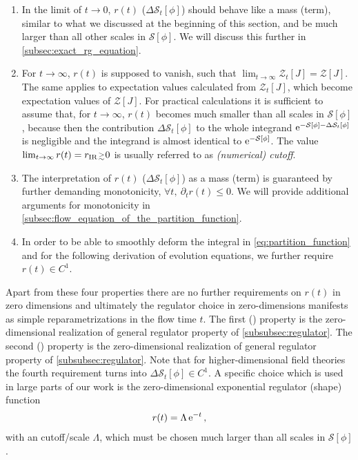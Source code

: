 	\begin{enumerate}
		\item	In the limit of $t \rightarrow 0$, $r(t)$ ($\Delta \mathcal{S}_t [ \phi ] $) should behave like a mass (term), similar to what we discussed at the beginning of this section, and be much larger than all other scales in $\mathcal{S}[\phi]$. We will discuss this further in \cref{subsec:exact_rg_equation}.
		
		\item	For $t \rightarrow \infty$, $r(t)$ is supposed to vanish, such that $\lim_{t \rightarrow \infty} \mathcal{Z}_t [J]=\mathcal{Z}[J]$.
		The same applies to expectation values calculated from $\mathcal{Z}_t[J]$, which become expectation values of $\mathcal{Z}[J]$.
		For practical calculations it is sufficient to assume that, for $t \rightarrow \infty$, $r(t)$ becomes much smaller than all scales in $\mathcal{S}[\phi]$, because then the contribution $\Delta \mathcal{S}_t [\phi]$ to the whole integrand $\mathrm{e}^{- \mathcal{S}[\phi] - \Delta \mathcal{S}_t [\phi]}$ is negligible and the integrand is almost identical to $\mathrm{e}^{- \mathcal{S}[\phi]}$.
		The value $\lim_{t \rightarrow \infty} r ( t ) = r_\mathrm{IR} \smallergtrsim 0$ is usually referred to as \textit{(numerical) \ir{} cutoff}.
		
		\item	The interpretation of $r(t)$ ($\Delta \mathcal{S}_t [ \phi ]$) as a mass (term) is guaranteed by further demanding monotonicity, ${\forall t,\ \partial_t r(t) \leq 0}$.
		We will provide additional arguments for monotonicity in \cref{subsec:flow_equation_of_the_partition_function}.
				
		\item	In order to be able to smoothly deform the integral in \cref{eq:partition_function} and for the following derivation of evolution equations, we further require $r ( t ) \in C^1$.
	\end{enumerate}
Apart from these four properties there are no further requirements on $r(t)$ in zero dimensions and ultimately the regulator choice in zero-dimensions manifests as simple reparametrizations in the flow time $t$.
The first (\uv{}) property is the zero-dimensional realization of general regulator property  of \cref{subsubsec:regulator}.
The second (\ir{}) property is the zero-dimensional realization of general regulator property  of \cref{subsubsec:regulator}.
Note that for higher-dimensional field theories the fourth requirement turns into $\Delta \mathcal{S}_t [ \phi ] \in C^1$.
A specific choice which is used in large parts of our work is the zero-dimensional exponential regulator (shape) function
	\begin{align}
		r ( t ) = \Lambda \, \mathrm{e}^{- t} \, ,	\label{eq:exponential_regulator}
	\end{align}
with an \uv{} cutoff/scale $\Lambda$, which must be chosen much larger than all scales in $\mathcal{S} [ \phi ]$.

